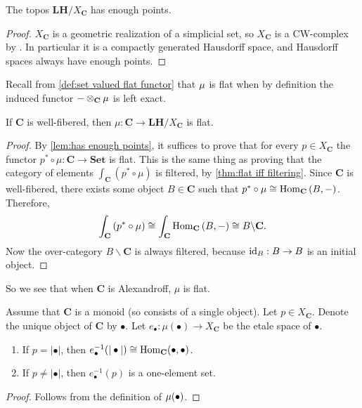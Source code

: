\begin{lemma}
\label{lem:has enough points}
The topos $\mathbf{LH}/X_\mathbf{C}$ has enough points.
\end{lemma}
\begin{proof}
$X_\mathbf{C}$ is a geometric realization of a simplicial set, so $X_\mathbf{C}$ is a CW-complex by \cite[Proposition I.2.3]{goersjardinne09}. In particular it is a compactly generated Hausdorff space, and Hausdorff spaces always have enough points.
\end{proof}

Recall from \cref{def:set valued flat functor} that $\operatorname{\mu}$ is flat when by definition the induced functor $- \otimes_{\mathbf{C}} \operatorname{\mu}$ is left exact.

\begin{lemma}
\label{lem:well-fibered implies flat}
If $\mathbf{C}$ is well-fibered, then $\mu : \mathbf{C} \to \mathbf{LH}/X_{\mathbf{C}}$ is flat.
\end{lemma}
\begin{proof}
By \cref{lem:has enough points}, it suffices to prove that for every $p \in X_{\mathbf{C}}$ the functor $p^* \circ \mu : \mathbf{C} \to \mathbf{Set}$ is flat. This is the same thing as proving that the category of elements $\int_{\mathbf{C}} \left( p^* \circ \mu \right)$ is filtered, by \cref{thm:flat iff filtering}. Since $\mathbf{C}$ is well-fibered, there exists some object $B \in \mathbf{C}$ such that $p^* \circ \mu \cong \operatorname{Hom}_{\mathbf{C}}\left(B,-\right)$. Therefore,
\[ \int_\mathbf{C} \left( p^* \circ \mu \right) \cong \int_{\mathbf{C}} \operatorname{Hom}_{\mathbf{C}}\left(B, - \right) \cong B \backslash \mathbf{C}. \]
Now the over-category $B \backslash \mathbf{C}$ is always filtered, because $\operatorname{id}_B : B \to B$ is an initial object.
\end{proof}

So we see that when $\mathbf{C}$ is Alexandroff, $\mu$ is flat.

\begin{lemma}
Assume that $\mathbf{C}$ is a monoid (so consists of a single object). Let $p \in X_{\mathbf{C}}$. Denote the unique object of $\mathbf{C}$ by $\bullet$. Let $e_\bullet : \mu(\bullet) \to X_\mathbf{C}$ be the etale space of $\bullet$.
\begin{enumerate}
	\item If $p = |\bullet|$, then $e_\bullet^{-1}(|\bullet|) \cong \operatorname{Hom}_\mathbf{C}(\bullet, \bullet)$.
	\item If $p \neq |\bullet|$, then $e_\bullet^{-1}(p)$ is a one-element set.
\end{enumerate}
\end{lemma}
\begin{proof}
Follows from the definition of $\operatorname{\mu}(\bullet)$.
\end{proof}

